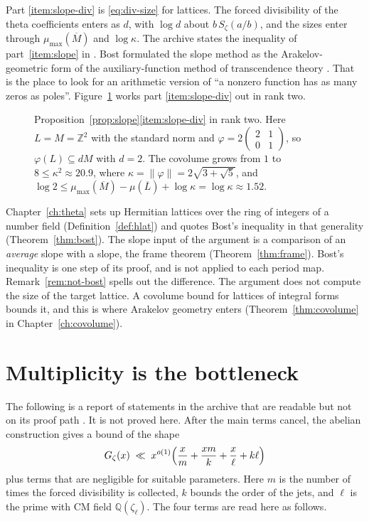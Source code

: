 \documentclass[11pt]{amsbook}
\theoremstyle{plain}
\theoremstyle{definition}
\theoremstyle{remark}
\numberwithin{equation}{section}
\numberwithin{figure}{chapter}
\numberwithin{table}{chapter}
\newcommand{\Q}{\mathbb{Q}}
\newcommand{\Z}{\mathbb{Z}}
\newcommand{\Gz}{G_{\zeta}}
\newcommand{\Sz}{S_{\zeta}}
\begin{document}
Part \eqref{item:slope-div} is \eqref{eq:div-size} for lattices. The
forced divisibility of the theta coefficients enters as $d$, with
$\log d$ about $b\,\Sz(a/b)$, and the sizes enter through
$\mu_{\max}(\overline M)$ and $\log\kappa$. The archive states the
inequality of part~\eqref{item:slope} in
\cite[\nolinkurl{Formalism/LatticeSlopes/Statement.lean}]
{AlpogeArchive2026}. Bost formulated the slope method as the
Arakelov-geometric form of the auxiliary-function method of
transcendence theory \cite{Bost1996}. That is the place to look for
an arithmetic version of ``a nonzero function has as many zeros as
poles''. Figure~\ref{fig:slope-lattice} works part
\eqref{item:slope-div} out in rank two.
\begin{figure}[tbp]
\centering
{}
\caption{Proposition~\ref{prop:slope}\eqref{item:slope-div} in rank
two. Here
$L=M=\Z^2$ with the standard norm and
$\varphi=2\left(\begin{smallmatrix}2&1\\0&1
\end{smallmatrix}\right)$, so $\varphi(L)\subseteq dM$ with $d=2$.
The covolume grows from $1$ to $8\le\kappa^2\approx20.9$, where
$\kappa=\|\varphi\|=2\sqrt{3+\sqrt5}$, and
$\log2\le\mu_{\max}(\overline M)-\mu(\overline L)+\log\kappa
=\log\kappa\approx1.52$.}
\label{fig:slope-lattice}
\end{figure}

Chapter~\ref{ch:theta} sets up Hermitian lattices over the ring of
integers of a number field (Definition~\ref{def:hlat}) and quotes
Bost's inequality in that generality (Theorem~\ref{thm:bost}). The
slope input of the argument is a comparison of an \emph{average}
slope with a slope, the frame theorem (Theorem~\ref{thm:frame}).
Bost's inequality is one step of its proof, and is not applied to
each period map. Remark~\ref{rem:not-bost} spells out the
difference. The argument does not compute the size of the target
lattice. A covolume bound for lattices of integral forms bounds it,
and this is where Arakelov geometry enters
(Theorem~\ref{thm:covolume} in Chapter~\ref{ch:covolume}).

\section{Multiplicity is the bottleneck}\label{sec:multiplicity}

The following is a report of statements in the archive that are
readable but not on its proof path
\cite[\nolinkurl{Formalism/ProductFormula/StatementOCCM.lean},
\texttt{OCCMEstimate}, \texttt{ZetaQuarterPowerCorollary}]
{AlpogeArchive2026}. It is not proved here. After the main terms
cancel, the abelian construction gives a bound of the shape
\[
  \Gz(x) \;\ll\; x^{o(1)}\Bigl(
    \frac{x}{m} + \frac{xm}{k} + \frac{x}{\ell} + k\ell \Bigr)
\]
plus terms that are negligible for suitable parameters. Here $m$ is
the number of times the forced divisibility is collected, $k$ bounds
the order of the jets, and $\ell$ is the prime with CM field
$\Q(\zeta_\ell)$. The four terms are read here as follows.
\end{document}
